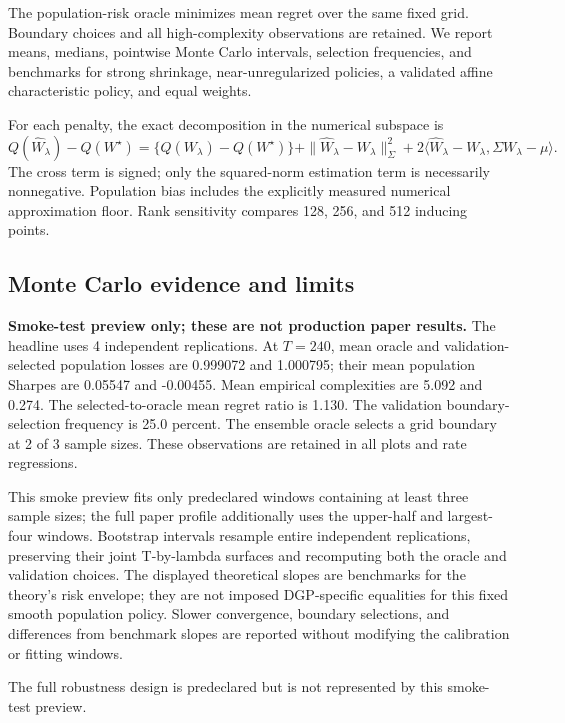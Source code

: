 The population-risk oracle minimizes mean regret over the same fixed grid.
Boundary choices and all high-complexity observations are retained. We report
means, medians, pointwise Monte Carlo intervals, selection frequencies, and
benchmarks for strong shrinkage, near-unregularized policies, a validated affine
characteristic policy, and equal weights.

For each penalty, the exact decomposition in the numerical subspace is
\[
Q(\widehat W_\lambda)-Q(W^\star)
=\{Q(W_\lambda)-Q(W^\star)\}
+\|\widehat W_\lambda-W_\lambda\|_{\Sigma}^2
+2\langle\widehat W_\lambda-W_\lambda,
\Sigma W_\lambda-\mu\rangle.
\]
The cross term is signed; only the squared-norm estimation term is necessarily
nonnegative. Population bias includes the explicitly measured numerical
approximation floor. Rank sensitivity compares 128, 256, and 512 inducing points.

\subsection{Monte Carlo evidence and limits}
\textbf{Smoke-test preview only; these are not production paper results.} The headline uses 4 independent replications. At $T=240$, mean oracle and validation-selected population losses are 0.999072 and 1.000795; their mean population Sharpes are 0.05547 and -0.00455. Mean empirical complexities are 5.092 and 0.274. The selected-to-oracle mean regret ratio is 1.130. The validation boundary-selection frequency is 25.0 percent. The ensemble oracle selects a grid boundary at 2 of 3 sample sizes. These observations are retained in all plots and rate regressions.

This smoke preview fits only predeclared windows containing at least three sample sizes; the full paper profile additionally uses the upper-half and largest-four windows.
Bootstrap intervals resample entire independent replications, preserving their
joint T-by-lambda surfaces and recomputing both the oracle and validation choices.
The displayed theoretical slopes are benchmarks for the theory's risk envelope;
they are not imposed DGP-specific equalities for this fixed smooth population
policy. Slower convergence, boundary selections, and differences from benchmark
slopes are reported without modifying the calibration or fitting windows.

The full robustness design is predeclared but is not represented by this smoke-test preview.







